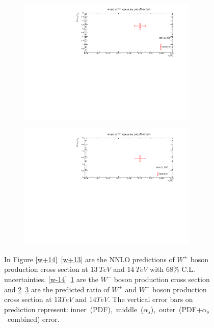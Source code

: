 \begin{figure}[H]
\begin{subfigure}{0.49\textwidth}
\caption{}
\label{w-13}
\end{subfigure}
\begin{subfigure}{0.49\textwidth}
\includegraphics[height=6cm, width=\textwidth]{chapter4/Rww14.pdf}

\caption{}
\label{Rww14}
\end{subfigure}
\begin{subfigure}{0.49\textwidth}
\includegraphics[height=6cm, width=\textwidth]{chapter4/Rww13.pdf}

\caption{}
\label{Rww13}
\end{subfigure}
\caption{In Figure \ref{w+14}~\ref{w+13} are the NNLO predictions of $W^{+}$ boson production cross section at $13~TeV$ and $14~TeV$ with $68\%$ C.L. uncertainties. \ref{w-14}~\ref{w-13} are the $W^{-}$ boson production cross section and \ref{Rww14}~\ref{Rww13} are the predicted ratio of $W^{+}$ and $W^{-}$ boson production cross section at $13TeV$ and $14TeV$. The vertical error bars on prediction represent: inner~(PDF),~middle~($\alpha_{s}$),~outer~(PDF+$\alpha_{s}$~combined) error. } 
\label{13tev2}
\end{figure}

